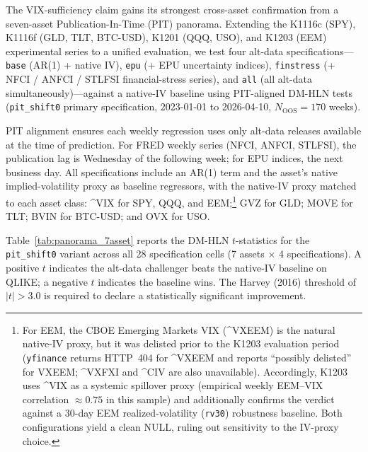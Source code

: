 \documentclass[12pt,a4paper]{article}
\begin{document}
The VIX-sufficiency claim gains its strongest cross-asset confirmation from a seven-asset Publication-In-Time (PIT) panorama. Extending the K1116c (SPY), K1116f (GLD, TLT, BTC-USD), K1201 (QQQ, USO), and K1203 (EEM) experimental series to a unified evaluation, we test four alt-data specifications---\texttt{base} (AR(1) + native IV), \texttt{epu} (+ EPU uncertainty indices), \texttt{finstress} (+ NFCI / ANFCI / STLFSI financial-stress series), and \texttt{all} (all alt-data simultaneously)---against a native-IV baseline using PIT-aligned DM-HLN tests (\texttt{pit\_shift0} primary specification, 2023-01-01 to 2026-04-10, $N_{\text{OOS}} = 170$ weeks).

PIT alignment ensures each weekly regression uses only alt-data releases available at the time of prediction. For FRED weekly series (NFCI, ANFCI, STLFSI), the publication lag is Wednesday of the following week; for EPU indices, the next business day. All specifications include an AR(1) term and the asset's native implied-volatility proxy as baseline regressors, with the native-IV proxy matched to each asset class: \^{}VIX for SPY, QQQ, and EEM;\footnote{For EEM, the CBOE Emerging Markets VIX (\^{}VXEEM) is the natural native-IV proxy, but it was delisted prior to the K1203 evaluation period (\texttt{yfinance} returns HTTP~404 for \^{}VXEEM and reports ``possibly delisted'' for VXEEM; \^{}VXFXI and \^{}CIV are also unavailable). Accordingly, K1203 uses \^{}VIX as a systemic spillover proxy (empirical weekly EEM--VIX correlation $\approx 0.75$ in this sample) and additionally confirms the verdict against a 30-day EEM realized-volatility (\texttt{rv30}) robustness baseline. Both configurations yield a clean NULL, ruling out sensitivity to the IV-proxy choice.} GVZ for GLD; MOVE for TLT; BVIN for BTC-USD; and OVX for USO.

Table~\ref{tab:panorama_7asset} reports the DM-HLN $t$-statistics for the \texttt{pit\_shift0} variant across all 28 specification cells (7 assets $\times$ 4 specifications). A positive $t$ indicates the alt-data challenger beats the native-IV baseline on QLIKE; a negative $t$ indicates the baseline wins. The Harvey (2016) threshold of $|t| > 3.0$ is required to declare a statistically significant improvement.
\end{document}
